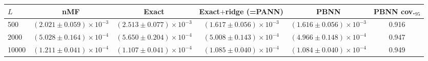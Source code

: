 \begin{tabular}{lccccc}
\hline\hline
$L$ & nMF & Exact & Exact$+$ridge (=PANN) & PBNN & PBNN cov.$_{95}$\\
\hline
500 & $(2.021\pm0.059){\times}10^{-3}$ & $(2.513\pm0.077){\times}10^{-3}$ & $(1.617\pm0.056){\times}10^{-3}$ & $(1.616\pm0.056){\times}10^{-3}$ & 0.916\\
2000 & $(5.028\pm0.164){\times}10^{-4}$ & $(5.650\pm0.204){\times}10^{-4}$ & $(5.008\pm0.143){\times}10^{-4}$ & $(4.966\pm0.148){\times}10^{-4}$ & 0.947\\
10000 & $(1.211\pm0.041){\times}10^{-4}$ & $(1.107\pm0.041){\times}10^{-4}$ & $(1.085\pm0.040){\times}10^{-4}$ & $(1.084\pm0.040){\times}10^{-4}$ & 0.949\\
\hline\hline
\end{tabular}
